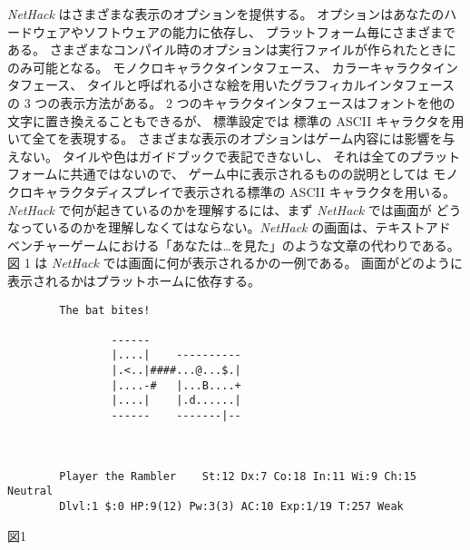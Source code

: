 {\it NetHack\/} はさまざまな表示のオプションを提供する。
オプションはあなたのハードウェアやソフトウェアの能力に依存し、
プラットフォーム毎にさまざまである。
さまざまなコンパイル時のオプションは実行ファイルが作られたときにのみ可能となる。
モノクロキャラクタインタフェース、
カラーキャラクタインタフェース、
タイルと呼ばれる小さな絵を用いたグラフィカルインタフェースの 3 つの表示方法がある。
2 つのキャラクタインタフェースはフォントを他の文字に置き換えることもできるが、
標準設定では 標準の ASCII キャラクタを用いて全てを表現する。
さまざまな表示のオプションはゲーム内容には影響を与えない。
タイルや色はガイドブックで表記できないし、
それは全てのプラットフォームに共通ではないので、
ゲーム中に表示されるものの説明としては
モノクロキャラクタディスプレイで表示される標準の ASCII キャラクタを用いる。
{\it NetHack\/} で何が起きているのかを理解するには、まず {\it NetHack\/} では画面が
どうなっているのかを理解しなくてはならない。{\it NetHack\/} の画面は、テキストアド
ベンチャーゲームにおける「あなたは…を見た」のような文章の代わりである。
図 1 は {\it NetHack\/} では画面に何が表示されるかの一例である。
画面がどのように表示されるかはプラットホームに依存する。

\begin{verbatim}
        The bat bites!

                ------
                |....|    ----------
                |.<..|####...@...$.|
                |....-#   |...B....+
                |....|    |.d......|
                ------    -------|--



        Player the Rambler    St:12 Dx:7 Co:18 In:11 Wi:9 Ch:15 Neutral
        Dlvl:1 $:0 HP:9(12) Pw:3(3) AC:10 Exp:1/19 T:257 Weak
\end{verbatim}
\begin{center}
図1
\end{center}

